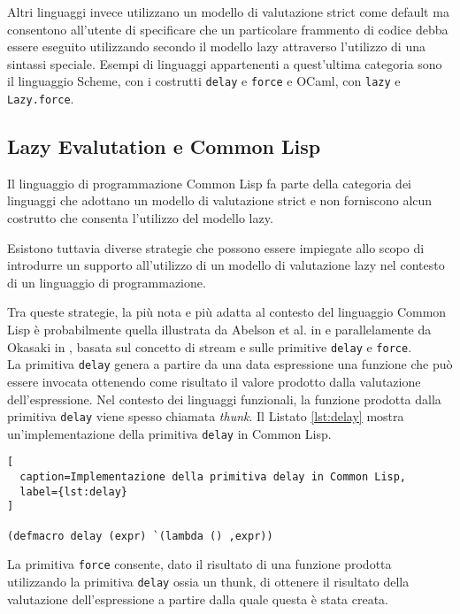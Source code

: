 Altri linguaggi invece utilizzano un modello di valutazione strict come default
ma consentono all'utente di specificare che un particolare frammento di codice
debba essere eseguito utilizzando secondo il modello lazy attraverso l'utilizzo
di una sintassi speciale. Esempi di linguaggi appartenenti a quest'ultima
categoria sono il linguaggio Scheme, con i costrutti \texttt{delay} e
\texttt{force} e OCaml, con \texttt{lazy} e \texttt{Lazy.force}.

\subsection{Lazy Evalutation e Common Lisp}
\label{lazy-eval-cl}

Il linguaggio di programmazione Common Lisp fa parte della categoria dei
linguaggi che adottano un modello di valutazione strict e non forniscono alcun
costrutto che consenta l'utilizzo del modello lazy.

Esistono tuttavia diverse strategie che possono essere impiegate allo scopo di
introdurre un supporto all'utilizzo di un modello di valutazione lazy nel
contesto di un linguaggio di programmazione.

Tra queste strategie, la più nota e più adatta al contesto del linguaggio Common
Lisp è probabilmente quella illustrata da Abelson et al. in \cite{Abelson1996} e
parallelamente da Okasaki in \cite{DBLP:conf/afp/Okasaki96}, basata sul concetto
di stream e sulle primitive \texttt{delay} e \texttt{force}.\\

La primitiva \texttt{delay} genera a partire da una data espressione una
funzione che può essere invocata ottenendo come risultato il valore prodotto
dalla valutazione dell'espressione. Nel contesto dei linguaggi funzionali, la
funzione prodotta dalla primitiva \texttt{delay} viene spesso chiamata
\textit{thunk}. Il Listato \ref{lst:delay} mostra un'implementazione della
primitiva \texttt{delay} in Common Lisp.

\begin{lstlisting}[
  caption=Implementazione della primitiva delay in Common Lisp,
  label={lst:delay}
]

(defmacro delay (expr) `(lambda () ,expr))

\end{lstlisting}

La primitiva \texttt{force} consente, dato il risultato di una funzione prodotta
utilizzando la primitiva \texttt{delay} ossia un thunk, di ottenere il risultato
della valutazione dell'espressione a partire dalla quale questa è stata creata.

